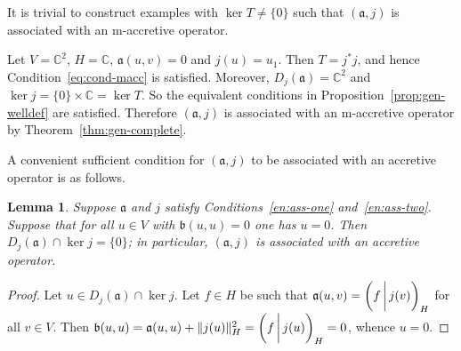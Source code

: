 \documentclass[a4paper,oneside,12pt]{amsart}
\theoremstyle{plain}
\newtheorem{lemma}[theorem]{Lemma}
\theoremstyle{definition}
\newenvironment{example}
{\pushQED{\qed}

\examplex}
{\popQED\endexamplex}
\DeclarePairedDelimiter\norm{\lVert}{\rVert}
\begin{document}
It is trivial to construct examples with $\ker T\ne \{0\}$ such that $({{\mathfrak{{a}}}},j)$ is associated with an {\ensuremath{\text{m}}}-accretive operator.
\begin{example}
Let $V={\mathbb{C}}^2$, $H={\mathbb{C}}$, ${{\mathfrak{{a}}}}(u,v)=0$ and $j(u)=u_1$. Then $T=j^*j$, and
hence Condition~\eqref{eq:cond-macc} is satisfied.
Moreover,
$D_j({{\mathfrak{{a}}}})={\mathbb{C}}^2$ and $\ker j=\{0\}\times{\mathbb{C}}=\ker T$. So the equivalent conditions in Proposition~\ref{prop:gen-welldef} are satisfied. Therefore $({{\mathfrak{{a}}}},j)$ is associated with an {\ensuremath{\text{m}}}-accretive operator by Theorem~\ref{thm:gen-complete}.
\end{example}

A convenient sufficient condition for $({{\mathfrak{{a}}}},j)$ to be associated with an accretive operator is as follows.
\begin{lemma}
Suppose ${{\mathfrak{{a}}}}$ and $j$ satisfy Conditions~\ref{en:ass-one} and~\ref{en:ass-two}.
Suppose that for all $u\in V$ with ${{\mathfrak{{b}}}}(u,u)=0$ one has $u=0$.
Then $D_j({{\mathfrak{{a}}}})\cap\ker j=\{0\}$; in particular, $({{\mathfrak{{a}}}},j)$ is associated with an accretive operator.
\end{lemma}
\begin{proof}
Let $u\in D_j({{\mathfrak{{a}}}})\cap\ker j$. Let $f\in H$ be such that ${{\mathfrak{{a}}}}(u,v)={{\ifthenelse{\equal{auto}{auto}}{\left({f}\mkern3mu{\biggm|}\mkern3mu {j(v)}\right)}{}
\ifthenelse{\equal{auto}{b}}{\bigl({f}\mkern3mu{\biggm|}\mkern3mu {j(v)}\bigr)}{}
\ifthenelse{\equal{auto}{B}}{\Bigl({f}\mkern3mu{\bigm|}\mkern3mu {j(v)}\Bigr)}{}
}}_H$ for all $v\in V$.
Then ${{\mathfrak{{b}}}}(u,u)={{\mathfrak{{a}}}}(u,u)+\norm{j(u)}_H^2={{\ifthenelse{\equal{auto}{auto}}{\left({f}\mkern3mu{\biggm|}\mkern3mu {j(u)}\right)}{}
\ifthenelse{\equal{auto}{b}}{\bigl({f}\mkern3mu{\biggm|}\mkern3mu {j(u)}\bigr)}{}
\ifthenelse{\equal{auto}{B}}{\Bigl({f}\mkern3mu{\bigm|}\mkern3mu {j(u)}\Bigr)}{}
}}_H=0$, whence $u=0$.
\end{proof}
\end{document}
